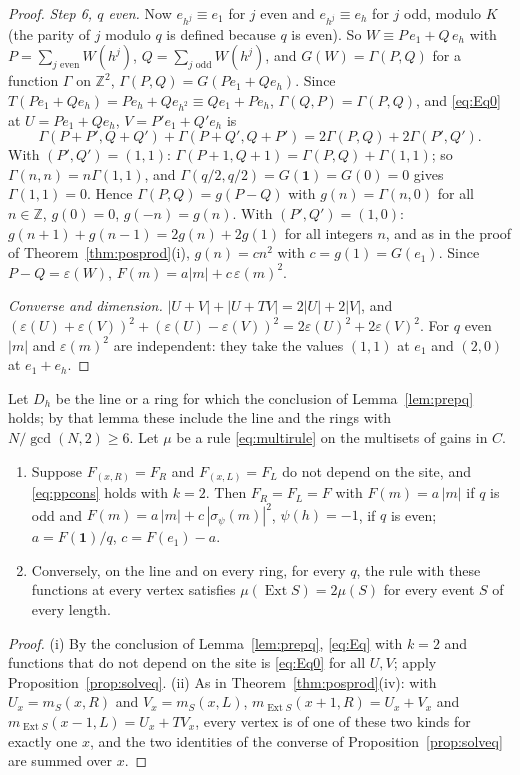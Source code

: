 \begin{proof}
\emph{Step 6, $q$ even.} Now $e_{h^j}\equiv e_1$ for $j$ even and $e_{h^j}\equiv e_h$ for $j$ odd, modulo $K$ (the parity of $j$ modulo $q$ is defined because $q$ is even). So $W\equiv P\,e_1+Q\,e_h$ with $P=\sum_{j\text{ even}}W(h^j)$, $Q=\sum_{j\text{ odd}}W(h^j)$, and $G(W)=\Gamma(P,Q)$ for a function $\Gamma$ on $\mathbb{Z}^2$, $\Gamma(P,Q)=G(Pe_1+Qe_h)$. Since $T(Pe_1+Qe_h)=Pe_h+Qe_{h^2}\equiv Qe_1+Pe_h$, $\Gamma(Q,P)=\Gamma(P,Q)$, and \eqref{eq:Eq0} at $U=Pe_1+Qe_h$, $V=P'e_1+Q'e_h$ is
\[
\Gamma(P+P',Q+Q')+\Gamma(P+Q',Q+P')=2\Gamma(P,Q)+2\Gamma(P',Q').
\]
With $(P',Q')=(1,1)$: $\Gamma(P+1,Q+1)=\Gamma(P,Q)+\Gamma(1,1)$; so $\Gamma(n,n)=n\Gamma(1,1)$, and $\Gamma(q/2,q/2)=G(\mathbf{1})=G(0)=0$ gives $\Gamma(1,1)=0$. Hence $\Gamma(P,Q)=g(P-Q)$ with $g(n)=\Gamma(n,0)$ for all $n\in\mathbb{Z}$, $g(0)=0$, $g(-n)=g(n)$. With $(P',Q')=(1,0)$: $g(n+1)+g(n-1)=2g(n)+2g(1)$ for all integers $n$, and as in the proof of Theorem~\ref{thm:posprod}(i), $g(n)=cn^2$ with $c=g(1)=G(e_1)$. Since $P-Q=\varepsilon(W)$, $F(m)=a|m|+c\,\varepsilon(m)^2$.

\emph{Converse and dimension.} $|U+V|+|U+TV|=2|U|+2|V|$, and $(\varepsilon(U)+\varepsilon(V))^2+(\varepsilon(U)-\varepsilon(V))^2=2\varepsilon(U)^2+2\varepsilon(V)^2$. For $q$ even $|m|$ and $\varepsilon(m)^2$ are independent: they take the values $(1,1)$ at $e_1$ and $(2,0)$ at $e_1+e_h$.
\end{proof}


\begin{theorem}\label{thm:posprodq}
Let $D_h$ be the line or a ring for which the conclusion of Lemma~\ref{lem:prepq} holds; by that lemma these include the line and the rings with $N/\gcd(N,2)\ge6$. Let $\mu$ be a rule \eqref{eq:multirule} on the multisets of gains in $C$.
\begin{enumerate}[label=(\roman*)]
\item Suppose $F_{(x,R)}=F_R$ and $F_{(x,L)}=F_L$ do not depend on the site, and \eqref{eq:ppcons} holds with $k=2$. Then $F_R=F_L=F$ with $F(m)=a\,|m|$ if $q$ is odd and $F(m)=a\,|m|+c\,|\sigma_\psi(m)|^2$, $\psi(h)=-1$, if $q$ is even; $a=F(\mathbf{1})/q$, $c=F(e_1)-a$.
\item Conversely, on the line and on every ring, for every $q$, the rule with these functions at every vertex satisfies $\mu(\operatorname{Ext}S)=2\mu(S)$ for every event $S$ of every length.
\end{enumerate}
\end{theorem}
\begin{proof}
(i) By the conclusion of Lemma~\ref{lem:prepq}, \eqref{eq:Eq} with $k=2$ and functions that do not depend on the site is \eqref{eq:Eq0} for all $U,V$; apply Proposition~\ref{prop:solveq}. (ii) As in Theorem~\ref{thm:posprod}(iv): with $U_x=m_S(x,R)$ and $V_x=m_S(x,L)$, $m_{\operatorname{Ext}S}(x+1,R)=U_x+V_x$ and $m_{\operatorname{Ext}S}(x-1,L)=U_x+TV_x$, every vertex is of one of these two kinds for exactly one $x$, and the two identities of the converse of Proposition~\ref{prop:solveq} are summed over $x$.
\end{proof}

